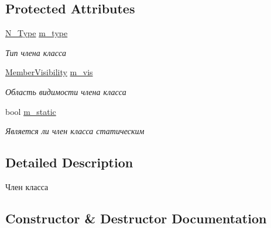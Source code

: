 \subsection*{Protected Attributes}
\begin{DoxyCompactItemize}
\item 
\hyperlink{classN__Type}{N\+\_\+\+Type} \hyperlink{classN__ClassMember_a0a5a7b177d59cad12e472cfc13663bba}{m\+\_\+type}
\begin{DoxyCompactList}\small\item\em Тип члена класса \end{DoxyCompactList}\item 
\hyperlink{ast_8h_a8cf536792064de0e4fc620bc6f1dc90e}{Member\+Visibility} \hyperlink{classN__ClassMember_ac035d5da0f01fc5323eb9fb3dfdd5bf5}{m\+\_\+vis}
\begin{DoxyCompactList}\small\item\em Область видимости члена класса \end{DoxyCompactList}\item 
bool \hyperlink{classN__ClassMember_a3149a9790156445d10c9774976890e92}{m\+\_\+static}
\begin{DoxyCompactList}\small\item\em Является ли член класса статическим \end{DoxyCompactList}\end{DoxyCompactItemize}


\subsection{Detailed Description}
Член класса 

\subsection{Constructor \& Destructor Documentation}
\hypertarget{classN__ClassMember_a579c8df412a16010bb152661ce8b07c9}{}
